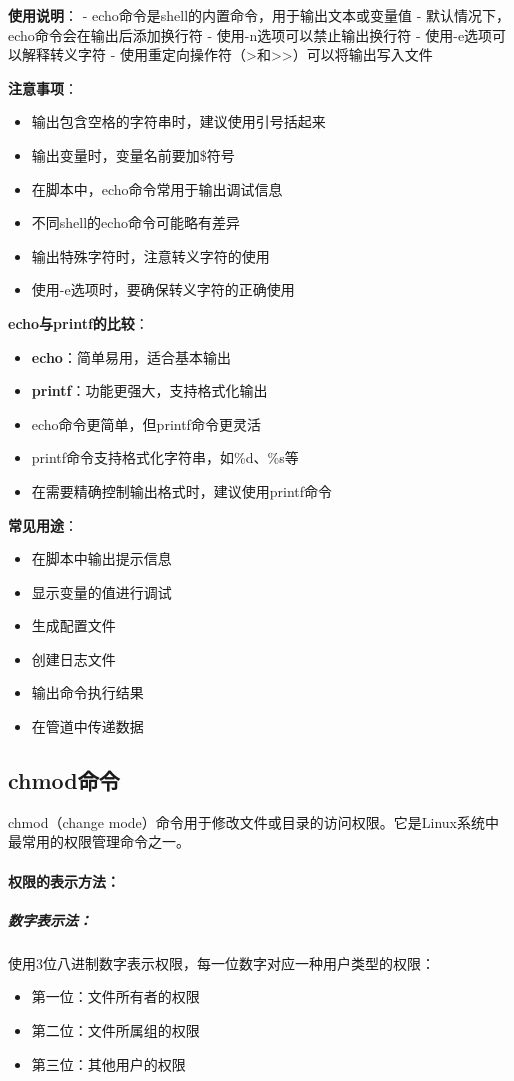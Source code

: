 \documentclass[12pt,UTF8]{ctexbook}
\begin{document}
\textbf{使用说明}：
- echo命令是shell的内置命令，用于输出文本或变量值
- 默认情况下，echo命令会在输出后添加换行符
- 使用-n选项可以禁止输出换行符
- 使用-e选项可以解释转义字符
- 使用重定向操作符（>和>>）可以将输出写入文件

\textbf{注意事项}：
\begin{itemize}
    \item 输出包含空格的字符串时，建议使用引号括起来
    \item 输出变量时，变量名前要加\$符号
    \item 在脚本中，echo命令常用于输出调试信息
    \item 不同shell的echo命令可能略有差异
    \item 输出特殊字符时，注意转义字符的使用
    \item 使用-e选项时，要确保转义字符的正确使用
\end{itemize}

\textbf{echo与printf的比较}：
\begin{itemize}
    \item \textbf{echo}：简单易用，适合基本输出
    \item \textbf{printf}：功能更强大，支持格式化输出
    \item echo命令更简单，但printf命令更灵活
    \item printf命令支持格式化字符串，如\%d、\%s等
    \item 在需要精确控制输出格式时，建议使用printf命令
\end{itemize}

\textbf{常见用途}：
\begin{itemize}
    \item 在脚本中输出提示信息
    \item 显示变量的值进行调试
    \item 生成配置文件
    \item 创建日志文件
    \item 输出命令执行结果
    \item 在管道中传递数据
\end{itemize}

\subsection{chmod命令}
chmod（change mode）命令用于修改文件或目录的访问权限。它是Linux系统中最常用的权限管理命令之一。

\paragraph{权限的表示方法：}
\subparagraph{数字表示法：}
使用3位八进制数字表示权限，每一位数字对应一种用户类型的权限：
\begin{itemize}
    \item 第一位：文件所有者的权限
    \item 第二位：文件所属组的权限
    \item 第三位：其他用户的权限
\end{itemize}
\end{document}
